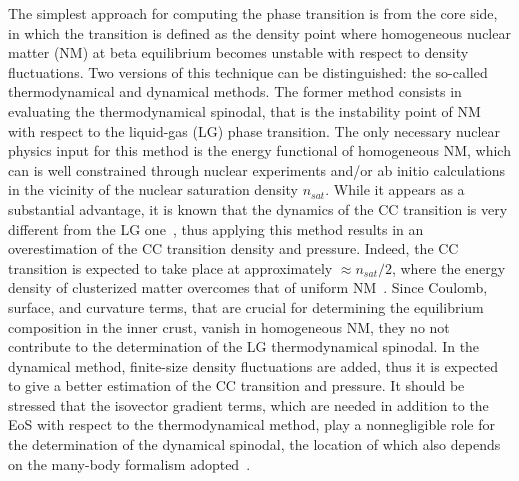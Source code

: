 The simplest approach for computing the phase transition is from the core side, 
in which the transition is defined as the density point where homogeneous 
nuclear matter (NM) at beta equilibrium becomes unstable with respect to 
density fluctuations. Two versions of this technique can be distinguished: the 
so-called thermodynamical \cite{Gonzalez2017} and 
dynamical \cite{Pethick1995cc,Antic2019} methods. 
The former method consists in evaluating the thermodynamical spinodal, that is 
the instability point of NM with respect to the liquid-gas (LG) phase 
transition. The only necessary nuclear physics input for this method is the 
energy functional of homogeneous NM, which can is well constrained through
nuclear experiments and/or ab initio calculations in the vicinity of the
nuclear saturation density $n_{sat}$. While it appears as a substantial 
advantage, it is known that the dynamics of the CC transition is very different 
from the LG one~\cite{Ducoin2007a,Ducoin2007b,Ducoin2008}, thus applying this 
method results in an overestimation of the 
CC transition density and pressure. Indeed, the CC transition is expected 
to take place at approximately $\approx n_{sat}/2$, where the energy density of 
clusterized matter overcomes that of uniform NM~\cite{BBP}. Since Coulomb, surface,
and curvature terms, that are crucial for determining the equilibrium
composition in the inner crust, vanish in homogeneous NM, they no not 
contribute to the determination of the LG thermodynamical spinodal. 
In the dynamical method, finite-size density fluctuations are added, thus 
it is expected to give a better estimation of the CC transition and pressure. 
It should be stressed that the isovector gradient terms, which are needed in
addition to the EoS with respect to the thermodynamical method, play a 
nonnegligible role for the determination of the dynamical spinodal, the
location of which also depends on the many-body formalism 
adopted~\cite{Ducoin2008}.

